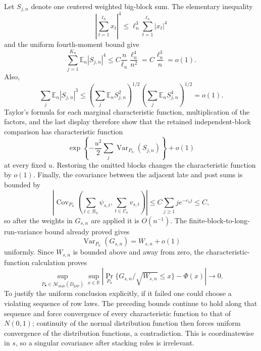 Let \(S_{j,n}\) denote one centered weighted big-block sum.  The elementary inequality
\[
 \left|\sum_{t=1}^{\ell_n}x_t\right|^4
 \leq\ell_n^3\sum_{t=1}^{\ell_n}|x_t|^4
\]
and the uniform fourth-moment bound give
\[
 \sum_{j=1}^{K_n}\mathbb E_n|S_{j,n}|^4
 \leq C\frac n{\ell_n}\frac{\ell_n^4}{n^2}
 =C\frac{\ell_n^3}{n}=o(1).
\]
Also,
\[
 \sum_j\mathbb E_n|S_{j,n}|^3
 \leq
 \left(\sum_j\mathbb E_nS_{j,n}^2\right)^{1/2}
 \left(\sum_j\mathbb E_nS_{j,n}^4\right)^{1/2}
 =o(1).
\]
Taylor's formula for each marginal characteristic function, multiplication of the factors, and the last display therefore show that the retained independent-block comparison has characteristic function
\[
 \exp\left\{-\frac{u^2}{2}\sum_j\operatorname{Var}_{P_n}(S_{j,n})\right\}+o(1)
\]
at every fixed \(u\).  Restoring the omitted blocks changes the characteristic function by \(o(1)\).  Finally, the covariance between the adjacent late and post sums is bounded by
\[
 \left|\operatorname{Cov}_{P_n}\!\left(
  \sum_{t\in\mathcal B_n}\psi_{s,t},
  \sum_{t\in\mathcal C_n}v_{s,t}
 \right)\right|
 \leq C\sum_{j\geq1}j e^{-c_1j}\leq C,
\]
so after the weights in \(G_{s,n}\) are applied it is \(O(n^{-1})\).  The finite-block-to-long-run-variance bound already proved gives
\[
 \operatorname{Var}_{P_n}(G_{s,n})=W_{s,n}+o(1)
\]
uniformly.  Since \(W_{s,n}\) is bounded above and away from zero, the characteristic-function calculation proves
\[
 \sup_{P_\bullet\in\mathcal M_{\mathrm{stab}}(D_{\mathrm{gap}})}
 \sup_{x\in\mathbb R}
 \left|
  \Pr_{P_n}\{G_{s,n}/\sqrt{W_{s,n}}\leq x\}-\Phi(x)
 \right|\longrightarrow0.
\]
To justify the uniform conclusion explicitly, if it failed one could choose a violating sequence of row laws.  The preceding bounds continue to hold along that sequence and force convergence of every characteristic function to that of \(N(0,1)\); continuity of the normal distribution function then forces uniform convergence of the distribution functions, a contradiction.  This is coordinatewise in \(s\), so a singular covariance after stacking roles is irrelevant.

